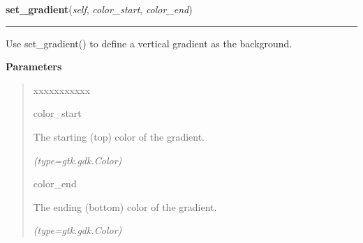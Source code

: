     \label{pygtk_chart:chart:Background:set_gradient}

    \vspace{0.5ex}

\hspace{.8\funcindent}\begin{boxedminipage}{\funcwidth}

    \raggedright \textbf{set\_gradient}(\textit{self}, \textit{color\_start}, \textit{color\_end})

    \vspace{-1.5ex}

    \rule{\textwidth}{0.5\fboxrule}
\setlength{\parskip}{2ex}
    Use set\_gradient() to define a vertical gradient as the background.

\setlength{\parskip}{1ex}
      \textbf{Parameters}
      \vspace{-1ex}

      \begin{quote}
        \begin{Ventry}{xxxxxxxxxxx}

          \item[color\_start]

          The starting (top) color of the gradient.

            {\it (type=gtk.gdk.Color)}

          \item[color\_end]

          The ending (bottom) color of the gradient.

            {\it (type=gtk.gdk.Color)}

        \end{Ventry}

      \end{quote}

    \end{boxedminipage}

    \label{pygtk_chart:chart:Background:get_gradient}

    \vspace{0.5ex}


